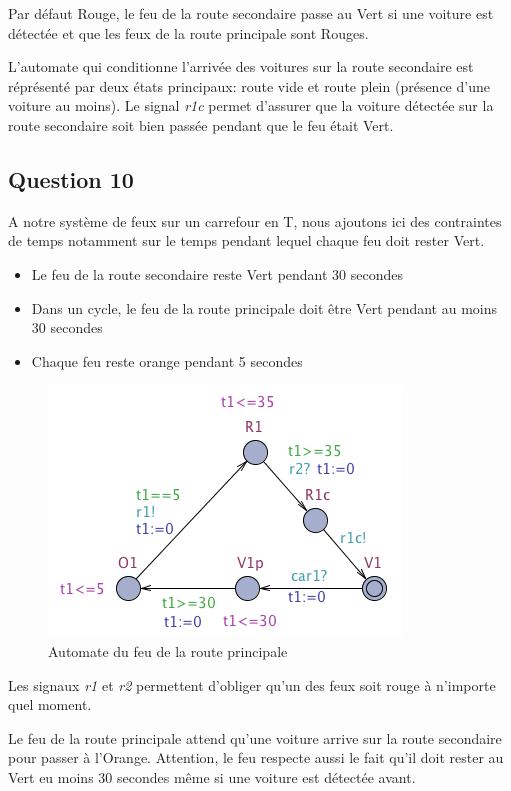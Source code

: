 \documentclass[pdftex,12pt,a4paper]{article}
\begin{document}
Par défaut Rouge, le feu de la route secondaire passe au Vert si une voiture est détectée et que les feux de la route principale sont Rouges.

L'automate qui conditionne l'arrivée des voitures sur la route secondaire est réprésenté par deux états principaux: route vide et route plein (présence d'une voiture au moins). Le signal \emph{r1c} permet d'assurer que la voiture détectée sur la route secondaire soit bien passée pendant que le feu était Vert.

\subsection{Question 10}

A notre système de feux sur un carrefour en T, nous ajoutons ici des contraintes de temps notamment sur le temps pendant lequel chaque feu doit rester Vert.

\begin{itemize}
	\item Le feu de la route secondaire reste Vert pendant 30 secondes
	\item Dans un cycle, le feu de la route principale doit être Vert pendant au moins 30 secondes
	\item Chaque feu reste orange pendant 5 secondes
\end{itemize}

\begin{figure}[H]
	\centering
	\includegraphics[scale=0.5]{ressources/part3/Q10-1.png}
	\caption{\label{fig:majorRoadQ10}Automate du feu de la route principale}
\end{figure}

Les signaux \emph{r1} et \emph{r2} permettent d'obliger qu'un des feux soit rouge à n'importe quel moment.

Le feu de la route principale attend qu'une voiture arrive sur la route secondaire pour passer à l'Orange. Attention, le feu respecte aussi le fait qu'il doit rester au Vert eu moins 30 secondes même si une voiture est détectée avant.
\end{document}
